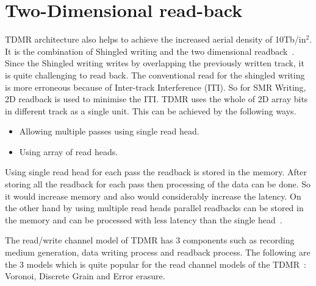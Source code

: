 \section{Two-Dimensional read-back}
TDMR architecture also helps to achieve the increased aerial density of 10Tb/in$^2$. It is the combination of Shingled writing and the two dimensional readback~\cite{IEEE_HITACHI}. Since the Shingled writing writes by overlapping the previously written track, it is quite challenging to read back. The conventional read for the shingled writing is more erroneous because of Inter-track Interference (ITI). So for SMR Writing, 2D readback is used to minimise the ITI. TDMR uses the whole of 2D array bits in different track as a single unit. This can be achieved by the following ways.
\begin{itemize}
	\item Allowing multiple passes using single read head.
	\item Using array of read heads.
\end{itemize}

Using single read head for each pass the readback is stored in the memory. After storing all the readback for each pass then processing of the data can be done. So it would increase memory and also would considerably increase the latency. On the other hand by using multiple read heads parallel readbacks can be stored in the memory and can be processed with less latency than the single head~\cite{Elidrissi}.

The read/write channel model of TDMR has 3 components such as recording medium generation, data writing process and readback process. The following are the 3 models which is quite popular for the read channel models of the TDMR~\cite{Krishnan,Vasic}: Voronoi, Discrete Grain and Error erasure.

